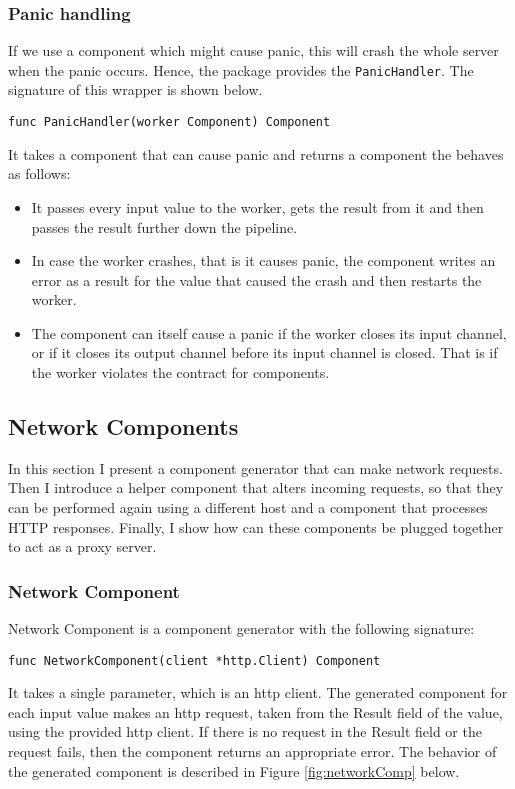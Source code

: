 \subsubsection{Panic handling}
If we use a component which might cause panic, this will crash the whole
server when the panic occurs. Hence, the package provides the 
\texttt{PanicHandler}. The signature of this wrapper is shown 
below.
\begin{lstlisting}
func PanicHandler(worker Component) Component
\end{lstlisting}
It takes a component that can cause panic and returns a component the 
behaves as follows:
\begin{itemize}
	\item It passes every input value to the worker, gets the result 
        from it and then passes the result further down the pipeline.
	\item In case the worker crashes, that is it causes panic, the component 
        writes an error as a result for the value that caused the crash 
        and then restarts the worker.
	\item The component can itself cause a panic if the worker closes its 
        input channel, or if it closes its output channel before its input 
        channel is closed. That is if the worker violates the contract
        for components.
\end{itemize}

\subsection{Network Components}
In this section I present a component generator that can make network
requests. Then I introduce a helper component that alters incoming 
requests, so that they can be performed again using a different host
and a component that processes HTTP responses. Finally, I show how
can these components be plugged together to act as a proxy server. 

\subsubsection{Network Component}
Network Component is a component generator with the following signature:
\begin{lstlisting}
func NetworkComponent(client *http.Client) Component
\end{lstlisting}
It takes a single parameter, which is an http client.
The generated component for each input value makes an http request,
taken from the Result field of the value, using the provided http client.
If there is no request in the Result field or the request fails, then
the component returns an appropriate error. The behavior of the generated 
component is described in Figure \ref{fig:networkComp} below.

